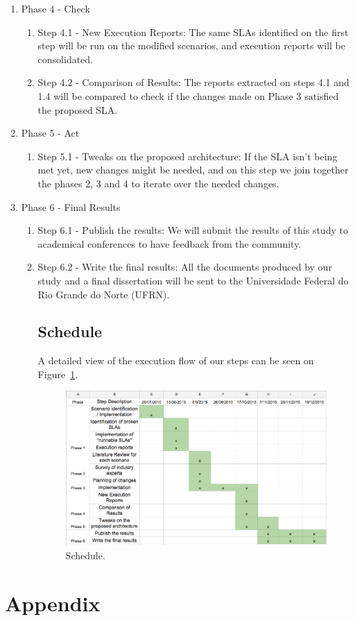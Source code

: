 \documentclass{article}
\begin{document}
\begin{enumerate}
\item{Phase 4 - Check}
\begin{enumerate}
\item {Step 4.1 - New Execution Reports: The same SLAs identified on the first step will be run on the modified scenarios, and execution reports will be consolidated.}
\item {Step 4.2 - Comparison of Results: The reports extracted on steps 4.1 and 1.4 will be compared to check if the changes made on Phase 3 satisfied the proposed SLA.}
\end{enumerate}

\item{Phase 5 - Act}
\begin{enumerate}
\item{Step 5.1 - Tweaks on the proposed architecture: If the SLA isn't being met yet, new changes might be needed, and on this step we join together the phases 2, 3 and 4 to iterate over the needed changes. }
\end{enumerate}


\item{Phase 6 - Final Results}
\begin{enumerate}
\item{Step 6.1 - Publish the results: We will submit the results of this study to academical conferences to have feedback from the community. }
\item{Step 6.2 - Write the final results: All the documents produced by our study and a final dissertation will be sent to the Universidade Federal do Rio Grande do Norte (UFRN).}


\subsection{Schedule}

A detailed view of the execution flow of our steps can be seen on Figure~\ref{fig:schedule}. 
\begin{figure}[ht!]
\centering
\includegraphics[width=120mm]{schedule.png}
\caption{Schedule.\label{fig:schedule}}
\end{figure}
\end{enumerate}

\end{enumerate}



\newpage

	

\newpage
\section{Appendix}\label{appendix}

\end{document}

